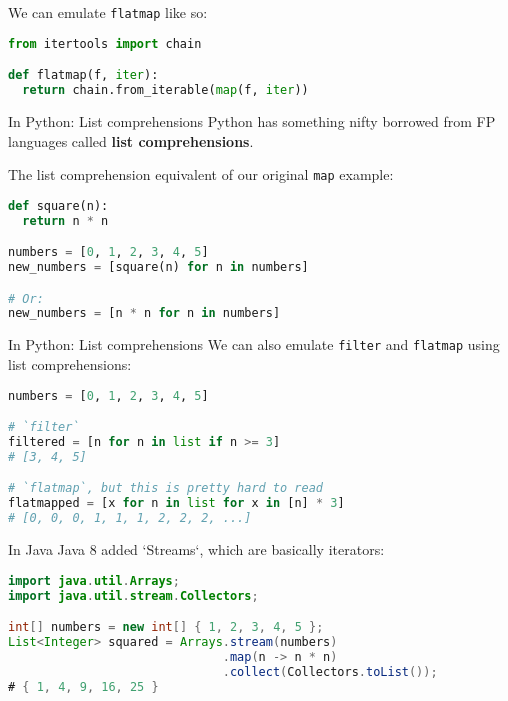 \documentclass[../index.tex]{subfiles}
\begin{document}
\begin{frame}[fragile]{\currenttitle}
  We can emulate \texttt{flatmap} like so: \\[1em]

  \begin{lstlisting}[language=Python]
from itertools import chain

def flatmap(f, iter):
  return chain.from_iterable(map(f, iter))
  \end{lstlisting}
\end{frame}

\renewcommand{\currenttitle}{In Python: List comprehensions}
\begin{frame}[fragile]{\currenttitle}
  Python has something nifty borrowed from FP languages called \textbf{list
  comprehensions}.

  The list comprehension equivalent of our original \texttt{map} example:

  \begin{lstlisting}[language=Python]
def square(n):
  return n * n

numbers = [0, 1, 2, 3, 4, 5]
new_numbers = [square(n) for n in numbers]

# Or:
new_numbers = [n * n for n in numbers]
  \end{lstlisting}
\end{frame}

\begin{frame}[fragile]{\currenttitle}
  We can also emulate \texttt{filter} and \texttt{flatmap} using list
  comprehensions:

  \begin{lstlisting}[language=Python]
numbers = [0, 1, 2, 3, 4, 5]

# `filter`
filtered = [n for n in list if n >= 3]
# [3, 4, 5]

# `flatmap`, but this is pretty hard to read
flatmapped = [x for n in list for x in [n] * 3]
# [0, 0, 0, 1, 1, 1, 2, 2, 2, ...]
  \end{lstlisting}
\end{frame}

\renewcommand{\currenttitle}{In Java}
\begin{frame}[fragile]{\currenttitle}
  Java 8 added `Streams`, which are basically iterators:

  \begin{lstlisting}[language=Java]
import java.util.Arrays;
import java.util.stream.Collectors;

int[] numbers = new int[] { 1, 2, 3, 4, 5 };
List<Integer> squared = Arrays.stream(numbers)
                              .map(n -> n * n)
                              .collect(Collectors.toList());
# { 1, 4, 9, 16, 25 }
  \end{lstlisting}
\end{frame}
\end{document}
